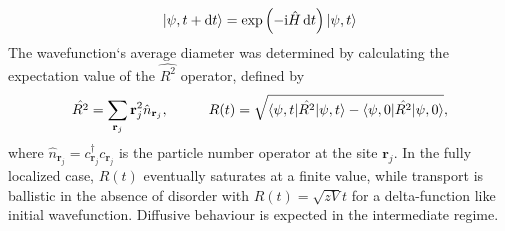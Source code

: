 \documentclass[10pt,a4paper]{article}
\begin{document}
\begin{equation}\label{eq:propagation}
\vert\psi, t+\mathrm{d}t\rangle=\exp\left(-\mathrm{i}\hat{H}\,\mathrm{d} t\right)\vert\psi, t\rangle
\end{equation}
The wavefunction`s average diameter was determined by calculating the expectation value of the $\hat{R^2}$ operator, defined by
\begin{equation}\label{eq:spread}
\hat{R^2}=\sum\limits_{\mathbf{r}_j} \mathbf{r}_j^2 \hat{n}_{\mathbf{r}_j}, \hspace{10mm} R(t)=\sqrt{\bra{\psi,t} \hat{R^2}\ket{\psi,t}-\bra{\psi,0} \hat{R^2}\ket{\psi,0}},
\end{equation}
where $\hat{n}_{\mathbf{r}_j}=c^\dagger_{\mathbf{r}_j}c_{\mathbf{r}_j}$ is the particle number operator at the site $\mathbf{r}_j$. In the fully localized case, $R(t)$ eventually saturates at a finite value, while transport is ballistic in the absence of disorder with $R(t)=\sqrt{zV}t$ for a delta-function like initial wavefunction. Diffusive behaviour is expected in the intermediate regime. 
\end{document}

